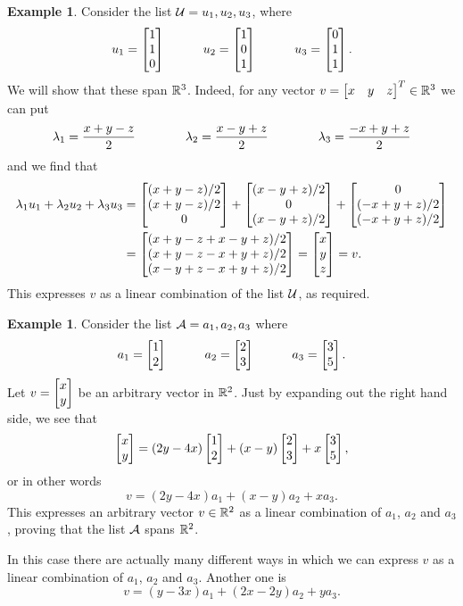 \documentclass[reqno]{amsart}
\theoremstyle{definition}
\newtheorem{example}[theorem]{Example}
\begin{document}
\begin{example}\label{eg-span-i}
 Consider the list $\mathcal{U}=u_1,u_2,u_3$, where
 \[ u_1 = \left[\begin{matrix} 1 \\ 1 \\ 0 \end{matrix}\right] \hspace{3em}
    u_2 = \left[\begin{matrix} 1 \\ 0 \\ 1 \end{matrix}\right] \hspace{3em}
    u_3 = \left[\begin{matrix} 0 \\ 1 \\ 1 \end{matrix}\right].
 \]
 We will show that these span ${\mathbb{R}}^3$.  Indeed, for any vector
 $v=\left[\begin{matrix} x & y & z\end{matrix}\right]^T\in{\mathbb{R}}^3$ we can put
 \[ \lambda_1 = \frac{ x+y-z}{2} \hspace{4em}
    \lambda_2 = \frac{ x-y+z}{2} \hspace{4em}
    \lambda_3 = \frac{-x+y+z}{2}
 \]
 and we find that
 \begin{align*}
  \lambda_1u_1+\lambda_2u_2+\lambda_3u_3
    &=
   \left[\begin{matrix} (x+y-z)/2 \\ (x+y-z)/2 \\ 0 \end{matrix}\right] +
   \left[\begin{matrix} (x-y+z)/2 \\ 0 \\ (x-y+z)/2 \end{matrix}\right] +
   \left[\begin{matrix} 0 \\ (-x+y+z)/2 \\ (-x+y+z)/2 \end{matrix}\right] \\
    &=
   \left[\begin{matrix} (x+y-z+x-y+z)/2 \\
        (x+y-z-x+y+z)/2 \\
        (x-y+z-x+y+z)/2 \end{matrix}\right]
    = \left[\begin{matrix} x \\ y \\ z \end{matrix}\right] = v.
 \end{align*}
 This expresses $v$ as a linear combination of the list $\mathcal{U}$, as
 required.
\end{example}

\begin{example}\label{eg-span-ii}
 Consider the list $\mathcal{A}=a_1,a_2,a_3$ where
 \[ a_1 = \left[\begin{matrix} 1 \\ 2 \end{matrix}\right] \hspace{3em}
    a_2 = \left[\begin{matrix} 2 \\ 3 \end{matrix}\right] \hspace{3em}
    a_3 = \left[\begin{matrix} 3 \\ 5 \end{matrix}\right].
 \]
 Let $v=\left[\begin{matrix} x \\ y\end{matrix}\right]$ be an arbitrary vector in ${\mathbb{R}}^2$.  Just by
 expanding out the right hand side, we see that
 \[ \left[\begin{matrix} x \\ y \end{matrix}\right] =
     (2y-4x)\left[\begin{matrix} 1 \\ 2 \end{matrix}\right] + (x-y)\left[\begin{matrix} 2\\ 3\end{matrix}\right] + x\left[\begin{matrix} 3\\5 \end{matrix}\right],
 \]
 or in other words
 \[ v = (2y-4x)a_1 + (x-y)a_2 + x a_3. \]
 This expresses an arbitrary vector $v\in{\mathbb{R}}^2$ as a linear combination
 of $a_1$, $a_2$ and $a_3$, proving that the list $\mathcal{A}$ spans ${\mathbb{R}}^2$.

 In this case there are actually many different ways in which we can
 express $v$ as a linear combination of $a_1$, $a_2$ and $a_3$.
 Another one is
 \[ v = (y-3x)a_1 + (2x-2y)a_2 + y a_3. \]
\end{example}
\end{document}
